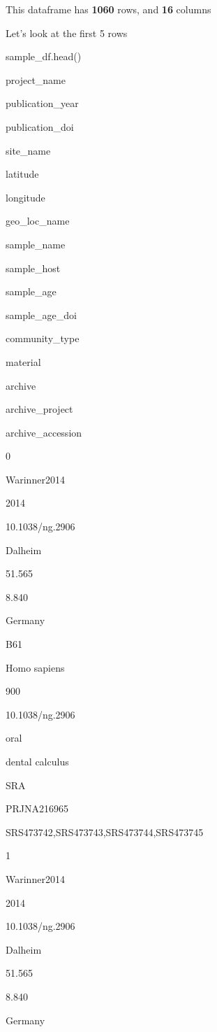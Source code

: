 \documentclass[
  letterpaper,
]{book}
\newenvironment{Shaded}{}{}
\newcommand{\NormalTok}[1]{\textcolor[rgb]{0.14,0.16,0.18}{#1}}
\begin{document}
This dataframe has \textbf{1060} rows, and \textbf{16} columns

Let's look at the first 5 rows

\begin{Shaded}
\begin{Highlighting}[]
\NormalTok{sample\_df.head()}
\end{Highlighting}
\end{Shaded}

project\_name

publication\_year

publication\_doi

site\_name

latitude

longitude

geo\_loc\_name

sample\_name

sample\_host

sample\_age

sample\_age\_doi

community\_type

material

archive

archive\_project

archive\_accession

0

Warinner2014

2014

10.1038/ng.2906

Dalheim

51.565

8.840

Germany

B61

Homo sapiens

900

10.1038/ng.2906

oral

dental calculus

SRA

PRJNA216965

SRS473742,SRS473743,SRS473744,SRS473745

1

Warinner2014

2014

10.1038/ng.2906

Dalheim

51.565

8.840

Germany
\end{document}
